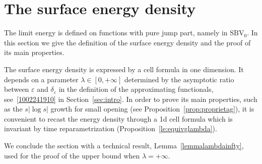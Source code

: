 \documentclass[a4paper,reqno]{amsart}
\theoremstyle{remark}
\newcommand{\PC}{\mathrm{SBV}_0}
\numberwithin{equation}{section}
\begin{document}
\section{The surface energy density}\label{sec:surfen}

The limit energy is defined on functions with pure jump part, namely in $\PC$. In this section we give the definition of the surface energy density and the proof of its main properties. 

The surface energy density is expressed by a cell formula in one dimension. It depends on a parameter $\lambda \in [0,+\infty]$ determined by the asymptotic ratio between $\varepsilon$ and $\delta_\varepsilon$ in the definition of the approximating functionals, see~\eqref{1002241910} in  Section~\ref{sec:intro}.
In order to prove its main properties, such as the $s |\log s|$ growth for small opening (see Proposition~\ref{prop:proprietag}), it is convenient to recast the energy density through a 1d cell formula which is invariant by time reparametrization (Proposition~\ref{le:equivglambda}).

We conclude the section with a technical result, Lemma~\ref{lemmalambdainfty}, used for the proof of the upper bound when $\lambda=+\infty$.


\smallskip
\end{document}
